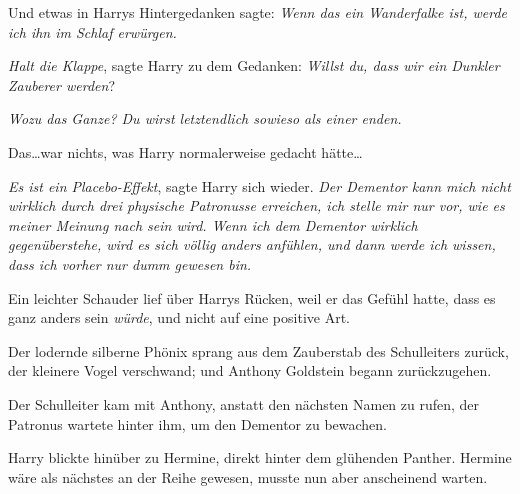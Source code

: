 Und etwas in Harrys Hintergedanken sagte: \emph{Wenn das ein Wanderfalke ist, werde ich ihn im Schlaf erwürgen.}

\emph{Halt die Klappe}, sagte Harry zu dem Gedanken: \emph{Willst du, dass wir ein Dunkler Zauberer werden}?

\emph{Wozu das Ganze? Du wirst letztendlich sowieso als einer enden.}

Das…war nichts, was Harry normalerweise gedacht hätte…

\emph{Es ist ein Placebo-Effekt}, sagte Harry sich wieder. \emph{Der Dementor kann mich nicht wirklich durch drei physische Patronusse erreichen, ich stelle mir nur vor, wie es meiner Meinung nach sein wird. Wenn ich dem Dementor wirklich gegenüberstehe, wird es sich völlig anders anfühlen, und dann werde ich wissen, dass ich vorher nur dumm gewesen bin.}

Ein leichter Schauder lief über Harrys Rücken, weil er das Gefühl hatte, dass es ganz anders sein \emph{würde}, und nicht auf eine positive Art.

Der lodernde silberne Phönix sprang aus dem Zauberstab des Schulleiters zurück, der kleinere Vogel verschwand; und Anthony Goldstein begann zurückzugehen.

Der Schulleiter kam mit Anthony, anstatt den nächsten Namen zu rufen, der Patronus wartete hinter ihm, um den Dementor zu bewachen.

Harry blickte hinüber zu Hermine, direkt hinter dem glühenden Panther. Hermine wäre als nächstes an der Reihe gewesen, musste nun aber anscheinend warten.

